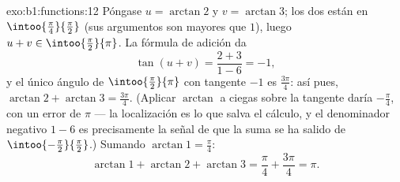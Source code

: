 \begin{solution}{exo:b1:functions:12}
Póngase $u = \arctan 2$ y $v = \arctan 3$; los dos están en
$\intoo{\frac\pi4}{\frac\pi2}$ (sus argumentos son mayores que $1$),
luego $u + v \in \intoo{\frac\pi2}{\pi}$. La fórmula de adición da
\[
\tan(u + v) = \frac{2 + 3}{1 - 6} = -1 ,
\]
y el único ángulo de $\intoo{\frac\pi2}{\pi}$ con tangente $-1$ es
$\frac{3\pi}4$: así pues, $\arctan 2 + \arctan 3 = \frac{3\pi}4$.
(Aplicar $\arctan$ a ciegas sobre la tangente daría $-\frac\pi4$, con
un error de $\pi$ --- la localización es lo que salva el cálculo, y el
denominador negativo $1 - 6$ es precisamente la señal de que la suma se
ha salido de $\intoo{-\frac\pi2}{\frac\pi2}$.) Sumando
$\arctan 1 = \frac\pi4$:
\[
\arctan 1 + \arctan 2 + \arctan 3 = \frac\pi4 + \frac{3\pi}4 = \pi .
\]
\end{solution}

